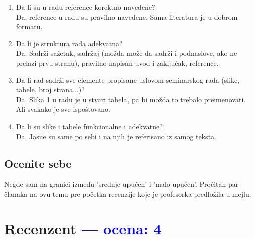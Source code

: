 \documentclass[a4paper]{report}
\newcommand{\odgovor}[1]{\textcolor{blue}{#1}}
\begin{document}
\begin{enumerate}
\item Da li su u radu reference korektno navedene?\\
Da, reference u radu su pravilno navedene. Sama literatura je u dobrom formatu.

\item Da li je struktura rada adekvatna?\\
Da. Sadrži sažetak, sadržaj (možda može da sadrži i podnaslove, ako ne prelazi prvu stranu), pravilno napisan uvod i zaključak, reference.

\item Da li rad sadrži sve elemente propisane uslovom seminarskog rada (slike, tabele, broj strana...)?\\
Da. Slika 1 u radu je u stvari tabela, pa bi možda to trebalo preimenovati. Ali svakako je sve ispoštovano.

\item Da li su slike i tabele funkcionalne i adekvatne?\\
Da. Jasne su same po sebi i na njih je referisano iz samog teksta.
\end{enumerate}

\section{Ocenite sebe}
Negde sam na granici između 'srednje upućen' i 'malo upućen'. Pročitah par članaka na ovu temu pre početka recenzije koje je profesorka predložila u mejlu.


\chapter{Recenzent \odgovor{--- ocena: 4} }
\end{document}
